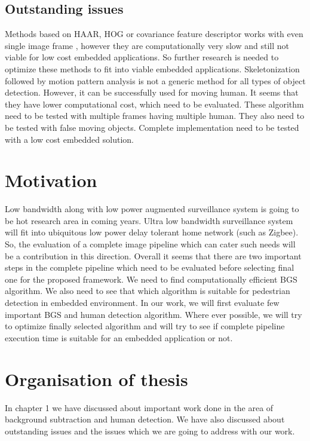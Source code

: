 \subsection{Outstanding issues}
\indent Methods based on HAAR, HOG or covariance feature descriptor
works with even single image frame , however they are computationally
very slow and still not viable for low cost embedded applications. So
further research is needed to optimize these methods to fit into viable
embedded applications. Skeletonization followed by motion pattern
analysis is not a generic method for all types of object detection.
However, it can be successfully used for moving human. It seems that
they have lower computational cost, which need to be evaluated. These
algorithm need to be tested with multiple frames having multiple human.
They also need to be tested with false moving objects. Complete
implementation need to be tested with a low cost embedded solution.\\

\pagebreak

\section{Motivation}
\indent Low bandwidth along with low power augmented surveillance system
is going to be hot research area in coming years. Ultra low bandwidth
surveillance system will fit into ubiquitous low power delay tolerant
home network (such as Zigbee). So, the evaluation of a complete image
pipeline which can cater such needs will be a contribution in this
direction. Overall it seems that there are two important steps in the
complete pipeline which need to be evaluated before selecting final one
for the proposed framework. We need to find computationally efficient
BGS algorithm. We also need to see that which algorithm is suitable for
pedestrian detection in embedded environment.  In our work, we will
first evaluate few important BGS and human detection algorithm.  Where
ever possible, we will try to optimize finally selected algorithm and
will try to see if complete pipeline execution time is suitable for an
embedded application or not.\\

\pagebreak

\section{Organisation of thesis}

\indent In chapter 1 we have discussed about important work done in the
area of background subtraction and human detection. We have also
discussed about outstanding issues and the issues which we are going to
address with our work.\\

